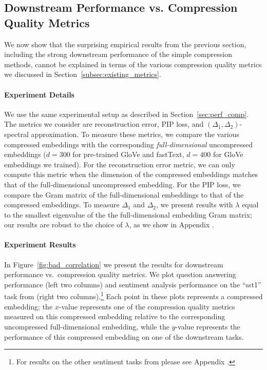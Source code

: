 \subsection{Downstream Performance vs. Compression Quality Metrics}
\label{subsec:hard_explain}
We now show that the surprising empirical results from the previous section, including the strong downstream performance of the simple compression methods, cannot be explained in terms of the various compression quality metrics we discussed in Section~\ref{subsec:existing_metrics}.

\paragraph{Experiment Details}
We use the same experimental setup as described in Section~\ref{sec:perf_comp}.
The metrics we consider are reconstruction error, PIP loss, and $(\Delta_1,\Delta_2)$-spectral approximation.
To measure these metrics, we compare the various compressed embeddings with the corresponding \textit{full-dimensional} uncompressed embeddings ($d=300$ for pre-trained GloVe and fastText, $d=400$ for GloVe embeddings we trained).
For the reconstruction error metric, we can only compute this metric when the dimension of the compressed embeddings matches that of the full-dimensional uncompressed embedding.
For the PIP loss, we compare the Gram matrix of the full-dimensional embeddings to that of the compressed embeddings.
To measure $\Delta_1$ and $\Delta_2$, we present results with $\lambda$ equal to the smallest eigenvalue of the the full-dimensional embedding Gram matrix; our results are robust to the choice of $\lambda$, as we show in Appendix .

\paragraph{Experiment Results}
In Figure~\ref{fig:bad_correlation} we present the results for downstream performance vs.\ compression quality metrics.
We plot question answering performance (left two columns) and sentiment analysis performance on the ``sst1'' task from \citet{kim14} (right two columns).\footnote{For results on the other sentiment tasks from \citet{kim14} please see Appendix .}
Each point in these plots represents a compressed embedding;
the $x$-value represents one of the compression quality metrics measured on this compressed embedding relative to the corresponding uncompressed full-dimensional embedding, while the $y$-value represents the performance of this compressed embedding on one of the downstream tasks.

